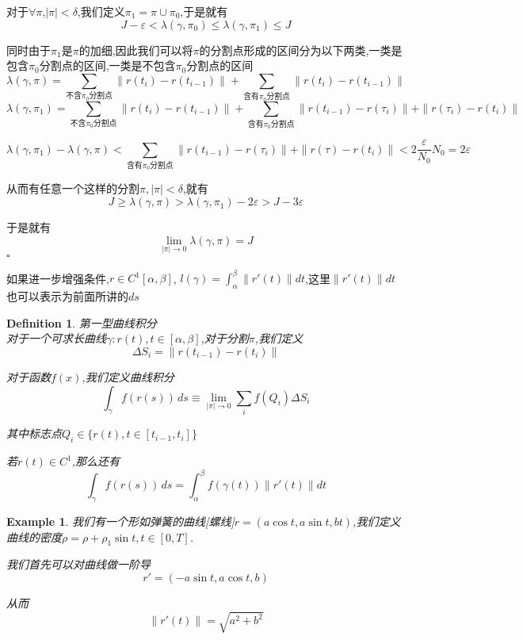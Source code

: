 \documentclass[11pt,hyperref,a4paper,UTF8]{ctexart}
\newtheorem{example}{Example}[subsection]
\newtheorem{definition}{Definition}[subsection]
\newenvironment{cproof}{%
\heiti{证明}\kaishu
}{%
  \hfill $\square$
  \par\bigskip
}
\begin{document}
\begin{CJK}{UTF8}{gkai}
\begin{cproof}
  对于$\forall \pi$,$|\pi| < \delta$,我们定义$\pi_1 = \pi \cup \pi_0$,于是就有
  \[J - \varepsilon < \lambda(\gamma,\pi_0) \leq \lambda(\gamma,\pi_1) \leq J\]

  同时由于$\pi_1$是$\pi$的加细,因此我们可以将$\pi$的分割点形成的区间分为以下两类,一类是包含$\pi_0$分割点的区间,一类是不包含$\pi_0$分割点的区间
  \[\lambda(\gamma,\pi) = \sum_{\text{不含}\pi_0\text{分割点}} \|r(t_i) - r(t_{i - 1})\| + \sum_{\text{含有}\pi_0\text{分割点}} \|r(t_i) - r(t_{i - 1})\|\]
  \[\lambda(\gamma,\pi_1) = \sum_{\text{不含}\pi_0\text{分割点}} \|r(t_i) - r(t_{i - 1})\| + \sum_{\text{含有}\pi_0\text{分割点}} \|r(t_{i - 1}) - r(\tau_i)\| + \|r(\tau_i) - r(t_i)\|\]

  \[\lambda(\gamma,\pi_1) - \lambda(\gamma,\pi) < \sum_{\text{含有}\pi_0\text{分割点}} \|r(t_{i - 1}) - r(\tau_i)\| + \|r(\tau) - r(t_i)\| < 2\frac{\varepsilon}{N_0} N_0 = 2 \varepsilon\]

  从而有任意一个这样的分割$\pi,|\pi| < \delta$,就有
  \[J \geq \lambda(\gamma,\pi) > \lambda(\gamma,\pi_1) - 2\varepsilon > J - 3\varepsilon\]

  于是就有
  \[\lim_{|\pi| \to 0} \lambda(\gamma,\pi) = J\]
\end{cproof}

如果进一步增强条件,$r \in C^1[\alpha,\beta]$, $l(\gamma) = \int_{\alpha}^{\beta} \|r'(t)\|dt$,这里$\|r'(t)\|dt$也可以表示为前面所讲的$ds$


\begin{definition}
  第一型曲线积分\\

  对于一个可求长曲线$\gamma: r(t), t \in [\alpha,\beta]$,对于分割$\pi$,我们定义
  \[\Delta S_i = \|r(t_{i - 1}) - r(t_i)\|\]

  对于函数$f(x)$,我们定义曲线积分
  \[\int_{\gamma} f(r(s))\, ds \equiv \lim_{|\pi| \to 0} \sum_{i} f(Q_i) \Delta S_i\]

  其中标志点$Q_i \in \{r(t), t \in [t_{i - 1},t_i]\}$

  若$r(t) \in C^1$,那么还有
  \[\int_{\gamma} f(r(s))\, ds = \int_{\alpha}^{\beta}f(\gamma(t))\|r'(t)\| dt\]
\end{definition}

\begin{example}
  我们有一个形如弹簧的曲线[螺线]$r = (a\cos t,a \sin t,b t)$,我们定义曲线的密度$\rho = \rho + \rho_1 \sin t, t \in [0,T]$.

  我们首先可以对曲线做一阶导
  \[r' = (-a \sin t, a \cos t, b)\]
  
  从而
  \[\|r'(t)\| = \sqrt{a^2 + b^2}\]
  

\end{example}
\end{CJK}
\end{document}
